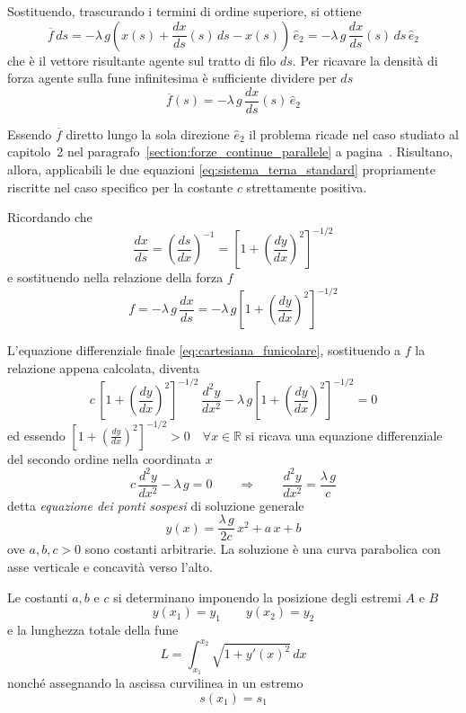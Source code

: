 Sostituendo, trascurando i termini di ordine superiore, si ottiene
\[
 \overline{f}\,ds = -\lambda\,g\left(x(s) + \dfrac{dx}{ds}(s)\,ds - x(s)\right)\,\hat{e}_2 = -\lambda\,g\,\dfrac{dx}{ds}(s)\,ds\,\hat{e}_2 
\]
che è il vettore risultante agente sul tratto di filo $ds$. Per ricavare la densità di forza agente sulla fune infinitesima è sufficiente dividere per $ds$
\[
 \overline{f}(s) = -\lambda\,g\,\dfrac{dx}{ds}(s)\,\hat{e}_2
\]

Essendo $\overline{f}$ diretto lungo la sola direzione $\hat{e}_2$ il problema ricade nel caso studiato al capitolo~2 nel paragrafo~\ref{section:forze_continue_parallele} a pagina~\pageref{section:forze_continue_parallele}. 
Risultano, allora, applicabili le due equazioni \eqref{eq:sistema_terna_standard} propriamente riscritte nel caso specifico per la costante $c$ strettamente positiva. 

Ricordando che 
\[
 \dfrac{dx}{ds} = \left(\dfrac{ds}{dx}\right)^{-1} = \left[1+\left(\dfrac{dy}{dx}\right)^2\right]^{-1/2}
\]
e sostituendo nella relazione della forza $f$
\[
 f = -\lambda\,g\,\dfrac{dx}{ds} = -\lambda\,g\left[1+\left(\dfrac{dy}{dx}\right)^2\right]^{-1/2}
\]

L'equazione differenziale finale \eqref{eq:cartesiana_funicolare}, sostituendo a $f$ la relazione appena calcolata, diventa
\begin{equation*}
 c\,\left[1+ \left(\dfrac{dy}{dx}\right)^2\right]^{-1/2}\,\dfrac{d^2 y}{dx^2} -\lambda\,g\left[1+\left(\dfrac{dy}{dx}\right)^2\right]^{-1/2} = 0
\end{equation*}
ed essendo $\left[1+\left(\frac{dy}{dx}\right)^2\right]^{-1/2}>0\quad\forall x\in\mathbb{R}$ si ricava una equazione differenziale del secondo ordine nella coordinata $x$
\begin{equation}
 \label{eq:equazione_differenziale_ponte_sospeso}
 c\,\dfrac{d^2y}{dx^2} - \lambda\,g = 0\qquad \Longrightarrow\qquad \dfrac{d^2y}{dx^2} = \dfrac{\lambda\,g}{c}
\end{equation}
detta \emph{equazione dei ponti sospesi} di soluzione generale 
\begin{equation}
\label{eq:equazione_ponte_sospeso}
 y(x) = \dfrac{\lambda\,g}{2 c}\,x^2 + a\,x+ b
\end{equation}
ove $a,b,c >0$ sono costanti arbitrarie. La soluzione è una curva parabolica con asse verticale e concavità verso l'alto.

Le costanti $a,b$ e $c$ si determinano imponendo la posizione degli estremi $A$ e $B$
\[
 y(x_1) = y_1 \qquad y(x_2)=y_2
\]
e la lunghezza totale della fune
\[
 L = \int_{x_1}^{x_2} \sqrt{1+y'(x)^2}\,dx
\]
nonché assegnando la ascissa curvilinea in un estremo
\[
 s(x_1) = s_1
\]

